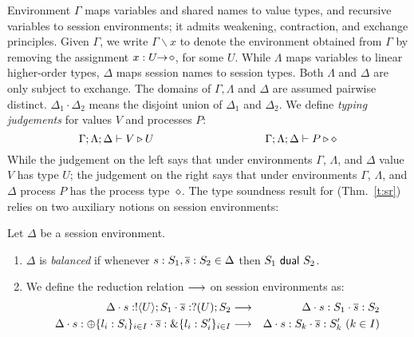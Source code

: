 Environment $\Gamma$ maps variables and shared names to value types, and recursive 
variables to session environments;  
it admits weakening, contraction, and exchange principles.
Given $\Gamma$, we write $\Gamma \backslash x$ to denote the environment obtained from 
 $\Gamma$ by removing the assignment $x:U\!\! \rightarrow\! \diamond$, for some $U$.
While  $\Lambda$ maps variables to 
 linear %
higher-order
types, $\Delta$ maps
session names to session types. 
Both $\Lambda$ and $\Delta$ %
are
only subject to exchange.  
The domains of $\Gamma,
\Lambda$ and $\Delta$ are assumed pairwise distinct. 
$\Delta_1\cdot \Delta_2$ means 
the disjoint union of $\Delta_1$ and $\Delta_2$.  
We define \emph{typing judgements} for values $V$
and processes $P$:
	$$\Gamma; \Lambda; \Delta \vdash V \triangleright U \qquad \qquad \qquad \qquad \qquad \Gamma; \Lambda; \Delta \vdash P \triangleright \diamond$$
While the judgement on the left
says that under environments $\Gamma$, $\Lambda$, and $\Delta$ value $V$
has type $U$; the  judgement on the right says that under
environments $\Gamma$, $\Lambda$, and $\Delta$ process $P$ has the process type~$\diamond$.
The type soundness result for \HOp (Thm.~\ref{t:sr})
relies on two auxiliary notions on session environments: 


\begin{definition}\label{d:wtenvred}%
	Let $\Delta$ be a session environment.
	\begin{enumerate}[$\bullet$]
	\item  $\Delta$ is {\em balanced} if whenever
	$s: S_1, \overline{s}: S_2 \in \Delta$ then $S_1 \ \mathsf{dual}\  S_2$.
	\item We define the reduction relation $\longrightarrow$ on session environments as: %
\begin{eqnarray*}
	\Delta \cat s: \btout{U} S_1 \cat \dual{s}: \btinp{U} S_2  & \red & 
	\Delta \cat s: S_1 \cat \dual{s}: S_2  \\
	\Delta \cat s: \btsel{l_i: S_i}_{i \in I} \cat \dual{s}: \btbra{l_i: S_i'}_{i \in I} &\red& \Delta \cat s: S_k \cat \dual{s}: S_k' \ (k \in I)
\end{eqnarray*}
\end{enumerate}
\end{definition}

